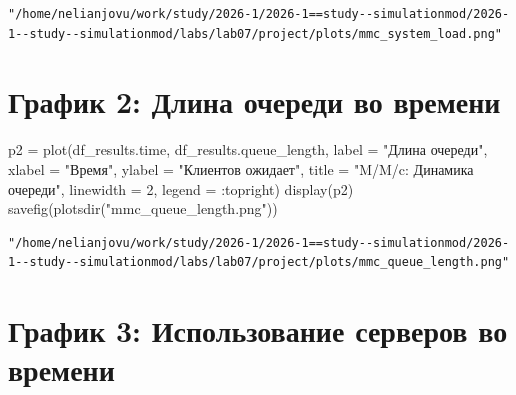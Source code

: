 \documentclass[
  12pt,
  a4paper,
  DIV=11,
  numbers=noendperiod]{scrreprt}
\newenvironment{Shaded}{\begin{snugshade}}{\end{snugshade}}
\newcommand{\FloatTok}[1]{\textcolor[rgb]{0.68,0.00,0.00}{#1}}
\newcommand{\FunctionTok}[1]{\textcolor[rgb]{0.28,0.35,0.67}{#1}}
\newcommand{\NormalTok}[1]{\textcolor[rgb]{0.00,0.23,0.31}{#1}}
\newcommand{\OperatorTok}[1]{\textcolor[rgb]{0.37,0.37,0.37}{#1}}
\newcommand{\StringTok}[1]{\textcolor[rgb]{0.13,0.47,0.30}{#1}}
\begin{document}


\begin{verbatim}
"/home/nelianjovu/work/study/2026-1/2026-1==study--simulationmod/2026-1--study--simulationmod/labs/lab07/project/plots/mmc_system_load.png"
\end{verbatim}

\section{График 2: Длина очереди во
времени}\label{ux433ux440ux430ux444ux438ux43a-2-ux434ux43bux438ux43dux430-ux43eux447ux435ux440ux435ux434ux438-ux432ux43e-ux432ux440ux435ux43cux435ux43dux438}

\begin{Shaded}
\begin{Highlighting}[]
\NormalTok{p2 }\OperatorTok{=} \FunctionTok{plot}\NormalTok{(df\_results.time, df\_results.queue\_length,}
\NormalTok{    label }\OperatorTok{=} \StringTok{"Длина очереди"}\NormalTok{,}
\NormalTok{    xlabel }\OperatorTok{=} \StringTok{"Время"}\NormalTok{,}
\NormalTok{    ylabel }\OperatorTok{=} \StringTok{"Клиентов ожидает"}\NormalTok{,}
\NormalTok{    title }\OperatorTok{=} \StringTok{"M/M/c: Динамика очереди"}\NormalTok{,}
\NormalTok{    linewidth }\OperatorTok{=} \FloatTok{2}\NormalTok{,}
\NormalTok{    legend }\OperatorTok{=} \OperatorTok{:}\NormalTok{topright)}
\FunctionTok{display}\NormalTok{(p2)}
\FunctionTok{savefig}\NormalTok{(}\FunctionTok{plotsdir}\NormalTok{(}\StringTok{"mmc\_queue\_length.png"}\NormalTok{))}
\end{Highlighting}
\end{Shaded}



\begin{verbatim}
"/home/nelianjovu/work/study/2026-1/2026-1==study--simulationmod/2026-1--study--simulationmod/labs/lab07/project/plots/mmc_queue_length.png"
\end{verbatim}

\section{График 3: Использование серверов во
времени}\label{ux433ux440ux430ux444ux438ux43a-3-ux438ux441ux43fux43eux43bux44cux437ux43eux432ux430ux43dux438ux435-ux441ux435ux440ux432ux435ux440ux43eux432-ux432ux43e-ux432ux440ux435ux43cux435ux43dux438}
\end{document}
